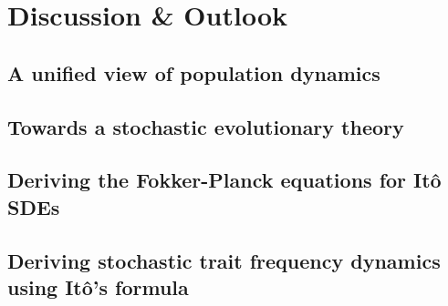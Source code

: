 \documentclass[twoside, 12pt]{iiser-thesis}
\begin{document}
\part{Discussion \& Outlook}
\chapter{A unified view of population dynamics}\label{chap_unification}

\chapter{Towards a stochastic evolutionary theory}\label{chap_stochasticity}

\begin{appendices}
\chapter{Deriving the Fokker-Planck equations for It\^{o} SDEs}\label{App_SDE_FPE}

\chapter{Deriving stochastic trait frequency dynamics using It\^{o}'s formula}\label{App_density_to_freq}

\end{appendices}

\printbibliography[title=References]
\end{document}

